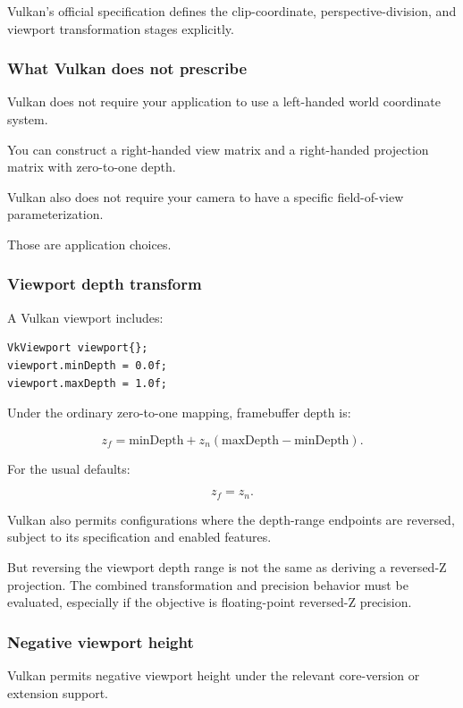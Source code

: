 Vulkan's official specification defines the clip-coordinate, perspective-division, and viewport transformation stages explicitly. 

\subsubsection{What Vulkan does not prescribe}\label{what-vulkan-does-not-prescribe}

Vulkan does not require your application to use a left-handed world coordinate system.

You can construct a right-handed view matrix and a right-handed projection matrix with zero-to-one depth.

Vulkan also does not require your camera to have a specific field-of-view parameterization.

Those are application choices.

\subsubsection{Viewport depth transform}\label{viewport-depth-transform}

A Vulkan viewport includes:

\begin{verbatim}
VkViewport viewport{};
viewport.minDepth = 0.0f;
viewport.maxDepth = 1.0f;
\end{verbatim}

Under the ordinary zero-to-one mapping, framebuffer depth is:

\[
 \boxed{ z_f= \text{minDepth} + z_n(\text{maxDepth}-\text{minDepth}) }.
\]

For the usual defaults:

\[
 z_f=z_n.
\]

Vulkan also permits configurations where the depth-range endpoints are reversed, subject to its specification and enabled features.

But reversing the viewport depth range is not the same as deriving a reversed-Z projection. The combined transformation and precision behavior must be evaluated, especially if the objective is floating-point reversed-Z precision.

\subsubsection{Negative viewport height}\label{negative-viewport-height}

Vulkan permits negative viewport height under the relevant core-version or extension support.

